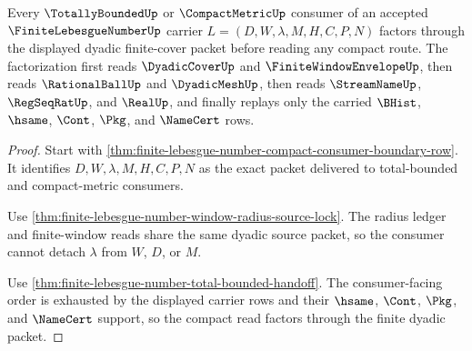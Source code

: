 \begin{theorem}
\label{thm:finite-lebesgue-number-total-bounded-consumer-factorization}
Every $\TotallyBoundedUp$ or $\CompactMetricUp$ consumer of an accepted $\FiniteLebesgueNumberUp$ carrier $L=(D,W,\lambda,M,H,C,P,N)$ factors through the displayed dyadic finite-cover packet before reading any compact route. The factorization first reads $\DyadicCoverUp$ and $\FiniteWindowEnvelopeUp$, then reads $\RationalBallUp$ and $\DyadicMeshUp$, then reads $\StreamNameUp$, $\RegSeqRatUp$, and $\RealUp$, and finally replays only the carried $\BHist$, $\hsame$, $\Cont$, $\Pkg$, and $\NameCert$ rows.
\end{theorem}
\begin{proof}
Start with \autoref{thm:finite-lebesgue-number-compact-consumer-boundary-row}. It identifies $D,W,\lambda,M,H,C,P,N$ as the exact packet delivered to total-bounded and compact-metric consumers.

Use \autoref{thm:finite-lebesgue-number-window-radius-source-lock}. The radius ledger and finite-window reads share the same dyadic source packet, so the consumer cannot detach $\lambda$ from $W$, $D$, or $M$.

Use \autoref{thm:finite-lebesgue-number-total-bounded-handoff}. The consumer-facing order is exhausted by the displayed carrier rows and their $\hsame$, $\Cont$, $\Pkg$, and $\NameCert$ support, so the compact read factors through the finite dyadic packet.
\end{proof}

